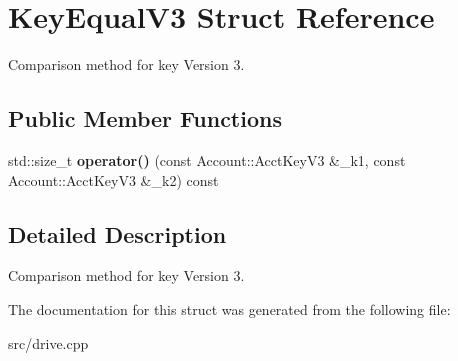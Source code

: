 \hypertarget{structKeyEqualV3}{}\section{Key\+Equal\+V3 Struct Reference}
\label{structKeyEqualV3}


Comparison method for key Version 3.  


\subsection*{Public Member Functions}
\begin{DoxyCompactItemize}
\item 
std\+::size\+\_\+t {\bfseries operator()} (const Account\+::\+Acct\+Key\+V3 \&\+\_\+k1, const Account\+::\+Acct\+Key\+V3 \&\+\_\+k2) const \hypertarget{structKeyEqualV3_a145e0500dbdf0ca18cbf155f32a59221}{}\label{structKeyEqualV3_a145e0500dbdf0ca18cbf155f32a59221}

\end{DoxyCompactItemize}


\subsection{Detailed Description}
Comparison method for key Version 3. 

The documentation for this struct was generated from the following file\+:\begin{DoxyCompactItemize}
\item 
src/drive.\+cpp\end{DoxyCompactItemize}
